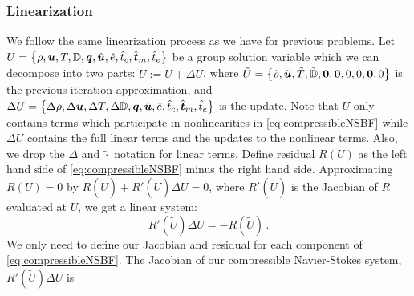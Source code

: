 \documentclass[Proposal.tex]{subfiles}
\begin{document}
\subsubsection{Linearization}
We follow the same linearization process as we have for previous problems.
Let $U=\left\{ \rho,\boldsymbol u,T,\mathbb{D},\boldsymbol q,\hat{\boldsymbol u},\hat e,\hat t_c,\hat{\boldsymbol t}_m,\hat t_e \right\}$ be a group solution variable which we can decompose into two parts:
$U:=\tilde U+\Delta U$, where
$\tilde U = \left\{ \tilde\rho,\tilde{\boldsymbol u},\tilde T,\tilde{\mathbb{D}},\boldsymbol{0},\boldsymbol{0},0,0,\boldsymbol{0},0 \right\}$ is the previous iteration approximation, 
and $\Delta U=\left\{ \Delta\rho,\Delta\boldsymbol u,\Delta T,\Delta\mathbb{D},\boldsymbol q,\hat{\boldsymbol u},\hat e,\hat t_c,\hat{\boldsymbol t}_m,\hat t_e \right\}$ is the update.
Note that $\tilde U$ only contains terms which participate in nonlinearities in \eqref{eq:compressibleNSBF} 
while $\Delta U$ contains the full linear terms and the updates to the nonlinear terms.
Also, we drop the $\Delta$ and $\tilde\cdot$ notation for linear terms.
Define residual $R(U)$ as the left hand side of \eqref{eq:compressibleNSBF} minus the right hand side.
Approximating $R(U)=0$ by $R(\tilde U)+R'(\tilde U)\Delta U=0$, where $R'(\tilde U)$ is the Jacobian of $R$ evaluated at $\tilde U$, we get a linear system:
\begin{equation}
	R'(\tilde U)\Delta U=-R(\tilde U)\,.
\end{equation}
We only need to define our Jacobian and residual for each component of \eqref{eq:compressibleNSBF}. 
The Jacobian of our compressible Navier-Stokes system, $R'(\tilde U)\Delta U$ is
\end{document}
